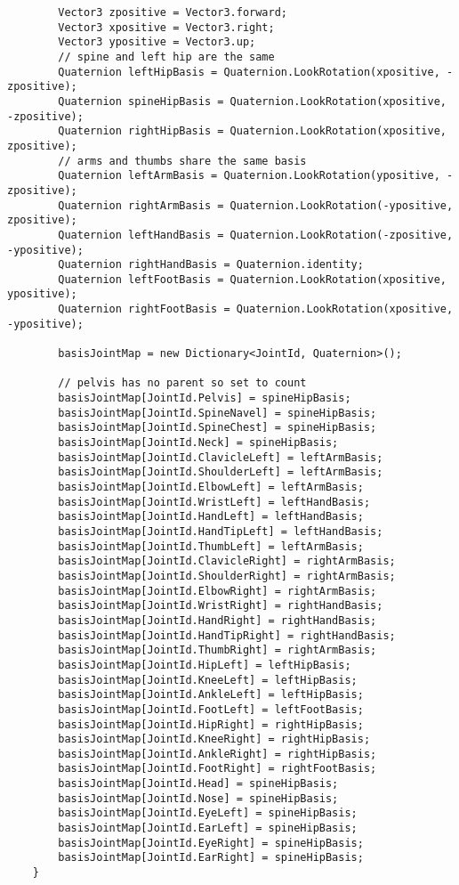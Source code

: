 \begin{verbatim}
        Vector3 zpositive = Vector3.forward;
        Vector3 xpositive = Vector3.right;
        Vector3 ypositive = Vector3.up;
        // spine and left hip are the same
        Quaternion leftHipBasis = Quaternion.LookRotation(xpositive, -zpositive);
        Quaternion spineHipBasis = Quaternion.LookRotation(xpositive, -zpositive);
        Quaternion rightHipBasis = Quaternion.LookRotation(xpositive, zpositive);
        // arms and thumbs share the same basis
        Quaternion leftArmBasis = Quaternion.LookRotation(ypositive, -zpositive);
        Quaternion rightArmBasis = Quaternion.LookRotation(-ypositive, zpositive);
        Quaternion leftHandBasis = Quaternion.LookRotation(-zpositive, -ypositive);
        Quaternion rightHandBasis = Quaternion.identity;
        Quaternion leftFootBasis = Quaternion.LookRotation(xpositive, ypositive);
        Quaternion rightFootBasis = Quaternion.LookRotation(xpositive, -ypositive);

        basisJointMap = new Dictionary<JointId, Quaternion>();

        // pelvis has no parent so set to count
        basisJointMap[JointId.Pelvis] = spineHipBasis;
        basisJointMap[JointId.SpineNavel] = spineHipBasis;
        basisJointMap[JointId.SpineChest] = spineHipBasis;
        basisJointMap[JointId.Neck] = spineHipBasis;
        basisJointMap[JointId.ClavicleLeft] = leftArmBasis;
        basisJointMap[JointId.ShoulderLeft] = leftArmBasis;
        basisJointMap[JointId.ElbowLeft] = leftArmBasis;
        basisJointMap[JointId.WristLeft] = leftHandBasis;
        basisJointMap[JointId.HandLeft] = leftHandBasis;
        basisJointMap[JointId.HandTipLeft] = leftHandBasis;
        basisJointMap[JointId.ThumbLeft] = leftArmBasis;
        basisJointMap[JointId.ClavicleRight] = rightArmBasis;
        basisJointMap[JointId.ShoulderRight] = rightArmBasis;
        basisJointMap[JointId.ElbowRight] = rightArmBasis;
        basisJointMap[JointId.WristRight] = rightHandBasis;
        basisJointMap[JointId.HandRight] = rightHandBasis;
        basisJointMap[JointId.HandTipRight] = rightHandBasis;
        basisJointMap[JointId.ThumbRight] = rightArmBasis;
        basisJointMap[JointId.HipLeft] = leftHipBasis;
        basisJointMap[JointId.KneeLeft] = leftHipBasis;
        basisJointMap[JointId.AnkleLeft] = leftHipBasis;
        basisJointMap[JointId.FootLeft] = leftFootBasis;
        basisJointMap[JointId.HipRight] = rightHipBasis;
        basisJointMap[JointId.KneeRight] = rightHipBasis;
        basisJointMap[JointId.AnkleRight] = rightHipBasis;
        basisJointMap[JointId.FootRight] = rightFootBasis;
        basisJointMap[JointId.Head] = spineHipBasis;
        basisJointMap[JointId.Nose] = spineHipBasis;
        basisJointMap[JointId.EyeLeft] = spineHipBasis;
        basisJointMap[JointId.EarLeft] = spineHipBasis;
        basisJointMap[JointId.EyeRight] = spineHipBasis;
        basisJointMap[JointId.EarRight] = spineHipBasis;
    }


\end{verbatim}
